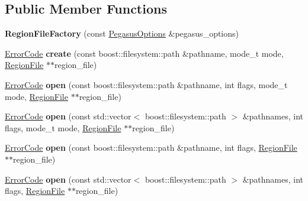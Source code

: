 \subsection*{Public Member Functions}
\begin{DoxyCompactItemize}
\item 
{\bfseries Region\+File\+Factory} (const \hyperlink{structalps_1_1PegasusOptions}{Pegasus\+Options} \&pegasus\+\_\+options)\hypertarget{classalps_1_1RegionFileFactory_af2ad3418a86a40927c481801c2652292}{}\label{classalps_1_1RegionFileFactory_af2ad3418a86a40927c481801c2652292}

\item 
\hyperlink{group__ERRORCODES_ga6263a3c9a0b8d36aea21cdd835ac99fe}{Error\+Code} {\bfseries create} (const boost\+::filesystem\+::path \&pathname, mode\+\_\+t mode, \hyperlink{classalps_1_1RegionFile}{Region\+File} $\ast$$\ast$region\+\_\+file)\hypertarget{classalps_1_1RegionFileFactory_a554ff5b3f73e4ab1ee5ade21784d7f1d}{}\label{classalps_1_1RegionFileFactory_a554ff5b3f73e4ab1ee5ade21784d7f1d}

\item 
\hyperlink{group__ERRORCODES_ga6263a3c9a0b8d36aea21cdd835ac99fe}{Error\+Code} {\bfseries open} (const boost\+::filesystem\+::path \&pathname, int flags, mode\+\_\+t mode, \hyperlink{classalps_1_1RegionFile}{Region\+File} $\ast$$\ast$region\+\_\+file)\hypertarget{classalps_1_1RegionFileFactory_ab91c685d8ce59846ad5d2dda7e0a2c19}{}\label{classalps_1_1RegionFileFactory_ab91c685d8ce59846ad5d2dda7e0a2c19}

\item 
\hyperlink{group__ERRORCODES_ga6263a3c9a0b8d36aea21cdd835ac99fe}{Error\+Code} {\bfseries open} (const std\+::vector$<$ boost\+::filesystem\+::path $>$ \&pathnames, int flags, mode\+\_\+t mode, \hyperlink{classalps_1_1RegionFile}{Region\+File} $\ast$$\ast$region\+\_\+file)\hypertarget{classalps_1_1RegionFileFactory_ad22600e030b7ceb11ca8e2691aaf116f}{}\label{classalps_1_1RegionFileFactory_ad22600e030b7ceb11ca8e2691aaf116f}

\item 
\hyperlink{group__ERRORCODES_ga6263a3c9a0b8d36aea21cdd835ac99fe}{Error\+Code} {\bfseries open} (const boost\+::filesystem\+::path \&pathname, int flags, \hyperlink{classalps_1_1RegionFile}{Region\+File} $\ast$$\ast$region\+\_\+file)\hypertarget{classalps_1_1RegionFileFactory_ac9332016b8741a3121546a1db7a78f1e}{}\label{classalps_1_1RegionFileFactory_ac9332016b8741a3121546a1db7a78f1e}

\item 
\hyperlink{group__ERRORCODES_ga6263a3c9a0b8d36aea21cdd835ac99fe}{Error\+Code} {\bfseries open} (const std\+::vector$<$ boost\+::filesystem\+::path $>$ \&pathnames, int flags, \hyperlink{classalps_1_1RegionFile}{Region\+File} $\ast$$\ast$region\+\_\+file)\hypertarget{classalps_1_1RegionFileFactory_af3327449b61e0f316c0f6802d6863f48}{}\label{classalps_1_1RegionFileFactory_af3327449b61e0f316c0f6802d6863f48}

\end{DoxyCompactItemize}
